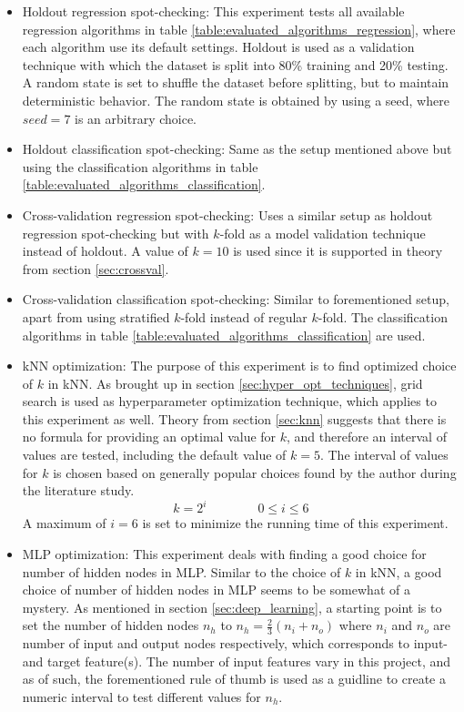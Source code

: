 	\begin{itemize}
		\item{Holdout regression spot-checking: } This experiment tests all available regression algorithms in table \ref{table:evaluated_algorithms_regression}, where each algorithm use its default settings. 
			Holdout is used as a validation technique with which the dataset is split into 80\% training and 20\% testing. A random state is set 					 to shuffle the dataset before splitting, but to maintain deterministic behavior. The random state is obtained by using a seed, where $seed= 7$ is an arbitrary choice. 
		\item{Holdout classification spot-checking: } Same as the setup mentioned above but using the classification algorithms in table \ref{table:evaluated_algorithms_classification}.
		\item{Cross-validation regression spot-checking: } Uses a similar setup as holdout regression spot-checking but with $k$-fold as a model validation 				technique instead of holdout. A value of $k = 10$ is used since it is supported in theory from section \ref{sec:crossval}.
		\item{Cross-validation classification spot-checking: } Similar to forementioned setup, apart from using stratified $k$-fold instead of regular $k$-fold. The classification algorithms in table \ref{table:evaluated_algorithms_classification} are used. 
		\item{kNN optimization: } The purpose of this experiment is to find optimized choice of $k$ in kNN. As brought up in section  \ref{sec:hyper_opt_techniques}, 				grid search is used as hyperparameter optimization technique, which applies to this experiment as well. Theory from section \ref{sec:knn} suggests that 				there is no formula for providing an optimal value for $k$, and therefore an interval of values are tested, including the default value of $k=5$. 				The interval of values for $k$ is chosen based on generally popular choices found by the author during the literature study.
			\begin{equation}
				k = 2^i \qquad \qquad 0 \leq i \leq 6
			\end{equation}
			A maximum of $i = 6$ is set to minimize the running time of this experiment. 
		\item{MLP optimization: } This experiment deals with finding a good choice for number of hidden nodes in MLP. Similar to the choice of $k$ in kNN, a good choice of number of hidden nodes in MLP seems to be somewhat of a mystery. As mentioned in section \ref{sec:deep_learning}, a starting point is to set the number of hidden nodes $n_h$ to $n_h = \frac{2}{3}(n_i + n_o)$ where $n_i$ and $n_o$ are number of input and output nodes respectively, which corresponds to input- and target feature(s). The number of input features vary in this project, and as of such, the forementioned rule of thumb is used as a guidline to create a numeric interval to test different values for $n_h$.

\end{itemize}
